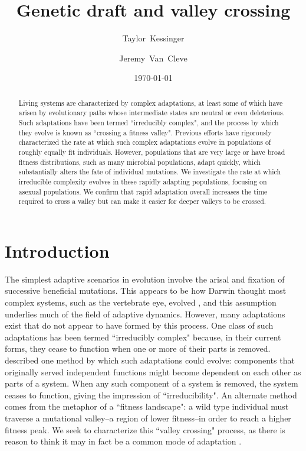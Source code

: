 \documentclass[rmp]{revtex4}
\begin{document}
\title{Genetic draft and valley crossing}
\author{Taylor~Kessinger}
\author{Jeremy~Van~Cleve}


\date{\today}

\begin{abstract}

Living systems are characterized by complex adaptations, at least some of which have arisen by evolutionary paths whose intermediate states are neutral or even deleterious.
Such adaptations have been termed ``irreducibly complex", and the process by which they evolve is known as ``crossing a fitness valley".
Previous efforts have rigorously characterized the rate at which such complex adaptations evolve in populations of roughly equally fit individuals.
However, populations that are very large or have broad fitness distributions, such as many microbial populations, adapt quickly, which substantially alters the fate of individual mutations.
We investigate the rate at which irreducible complexity evolves in these rapidly adapting populations, focusing on asexual populations.
We confirm that rapid adaptation overall increases the time required to cross a valley but can make it easier for deeper valleys to be crossed.
\end{abstract}

\maketitle

\section*{Introduction}

The simplest adaptive scenarios in evolution involve the arisal and fixation of successive beneficial mutations.
This appears to be how Darwin thought most complex systems, such as the vertebrate eye, evolved \citep{darwin_1859}, and this assumption underlies much of the field of adaptive dynamics.
However, many adaptations exist that do not appear to have formed by this process.
One class of such adaptations has been termed ``irreducibly complex" because, in their current forms, they cease to function when one or more of their parts is removed.
\citet{muller_1918} described one method by which such adaptations could evolve: components that originally served independent functions might become dependent on each other as parts of a system.
When any such component of a system is removed, the system ceases to function, giving the impression of ``irreducibility".
An alternate method comes from the metaphor of a ``fitness landscape": a wild type individual must traverse a mutational valley--a region of lower fitness--in order to reach a higher fitness peak.
We seek to characterize this ``valley crossing" process, as there is reason to think it may in fact be a common mode of adaptation \citep{trotter_2014}.
\end{document}
